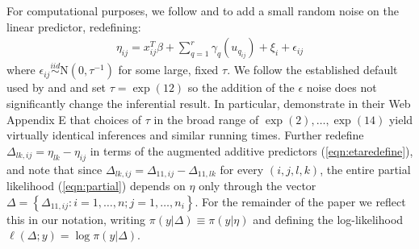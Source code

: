 \documentclass[]{article}
\begin{document}
For computational purposes, we follow \citet{inla} and \citet{casecross} to add a small random noise on the linear predictor, redefining: 
\begin{equation}\begin{aligned}\label{eqn:etaredefine}
\eta_{ij} =x_{ij}^{T}\beta+\sum_{q=1}^{r} \gamma_q(u_{q_{ij}}) +\xi_{i} + \epsilon_{ij}
\end{aligned}\end{equation}
where $\epsilon_{ij} \stackrel{iid}{\sim} \text{N}(0,\tau^{-1})$ for some large, fixed $\tau$. We follow the established default used by \citet{inla} and \citet{casecross} and set $\tau = \exp(12)$ so the addition of the $\epsilon$ noise does not significantly change the inferential result. In particular, \citet{casecross} demonstrate in their Web Appendix E that choices of $\tau$ in the broad range of $\exp(2),\ldots,\exp(14)$ yield virtually identical inferences and similar running times. Further redefine $\Delta_{lk,ij} = \eta_{lk} - \eta_{ij}$ in terms of the augmented additive predictors (\ref{eqn:etaredefine}), and note that since $\Delta_{lk,ij} = \Delta_{11,ij} - \Delta_{11,lk}$ for every $(i,j,l,k)$, the entire partial likelihood (\ref{eqn:partial}) depends on $\eta$ only through the vector $\Delta = \left\{\Delta_{11,ij}: i = 1,\ldots,n; j = 1,\ldots,n_{i} \right\}$. For the remainder of the paper we reflect this in our notation, writing $\pi(y|\Delta) \equiv \pi(y|\eta)$ and defining the log-likelihood $\ell(\Delta; y) = \log\pi(y|\Delta)$.
\end{document}

